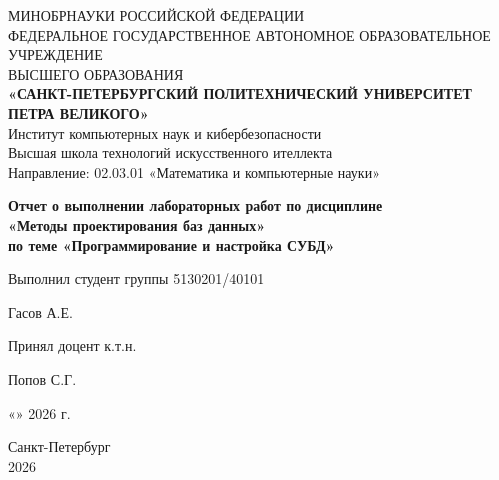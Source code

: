 \thispagestyle{empty}
\begin{center}
{\large 
МИНОБРНАУКИ РОССИЙСКОЙ ФЕДЕРАЦИИ \\ФЕДЕРАЛЬНОЕ ГОСУДАРСТВЕННОЕ  
АВТОНОМНОЕ ОБРАЗОВАТЕЛЬНОЕ УЧРЕЖДЕНИЕ \\ ВЫСШЕГО ОБРАЗОВАНИЯ \\ \vspace{7pt} \textbf{«САНКТ-ПЕТЕРБУРГСКИЙ ПОЛИТЕХНИЧЕСКИЙ УНИВЕРСИТЕТ ПЕТРА ВЕЛИКОГО»}\\ \vspace{7pt} Институт компьютерных наук и кибербезопасности\\ \vspace{4pt} Высшая школа технологий искусственного ителлекта\\ \vspace{4pt} Направление: 02.03.01 «Математика и компьютерные науки»

\vspace{100pt}
\textbf{Отчет о выполнении лабораторных работ по дисциплине}\\ \vspace{5pt} \textbf{«Методы проектирования баз данных»}
\\ \vspace{5pt} \textbf{по теме «Программирование и настройка СУБД»}

}
\end{center}

\vspace{60pt}
\noindent Выполнил студент группы 5130201/40101 \vspace{-25pt} \begin{flushright} \underline{\hspace{4cm}} Гасов А.Е. \hspace{0pt}
\end{flushright} \par

\noindent Принял доцент к.т.н.\vspace{-25pt}\begin{flushright} \underline{\hspace{4cm}} Попов С.Г. \end{flushright}

\vspace{50pt}
\begin{flushright}
    «\underline{\hspace{0.6cm}}» \underline{\hspace{2.5cm}} 2026 г.
\end{flushright}

\vspace{85pt}
\begin{center}
Санкт-Петербург \\ 2026
\end{center}

\newpage